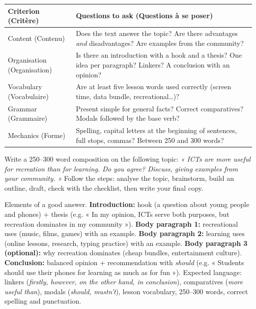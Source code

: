 \documentclass[11pt]{article}
\begin{document}
\begin{center}
\begin{tabularx}{\linewidth}{|l|X|}
\hline
\rowcolor{popgreenL} \textbf{Criterion (Critère)} & \textbf{Questions to ask (Questions à se poser)} \\
\hline
Content (Contenu) & Does the text answer the topic? Are there advantages \emph{and} disadvantages? Are examples from the community? \\
\hline
Organisation (Organisation) & Is there an introduction with a hook and a thesis? One idea per paragraph? Linkers? A conclusion with an opinion? \\
\hline
Vocabulary (Vocabulaire) & Are at least five lesson words used correctly (screen time, data bundle, recreational\ldots)? \\
\hline
Grammar (Grammaire) & Present simple for general facts? Correct comparatives? Modals followed by the base verb? \\
\hline
Mechanics (Forme) & Spelling, capital letters at the beginning of sentences, full stops, commas? Between 250 and 300 words? \\
\hline
\end{tabularx}
\end{center}

\begin{exercice}
Write a 250--300 word composition on the following topic: \emph{« ICTs are more useful for recreation than for learning. Do you agree? Discuss, giving examples from your community. »} Follow the steps: analyse the topic, brainstorm, build an outline, draft, check with the checklist, then write your final copy.
\end{exercice}

\begin{corrige}[Exercice 1]
Elements of a good answer. \textbf{Introduction:} hook (a question about young people and phones) + thesis (e.g. « In my opinion, ICTs serve both purposes, but recreation dominates in my community »). \textbf{Body paragraph 1:} recreational uses (music, films, games) with an example. \textbf{Body paragraph 2:} learning uses (online lessons, research, typing practice) with an example. \textbf{Body paragraph 3 (optional):} why recreation dominates (cheap bundles, entertainment culture). \textbf{Conclusion:} balanced opinion + recommendation with \emph{should} (e.g. « Students should use their phones for learning as much as for fun »). Expected language: linkers (\emph{firstly, however, on the other hand, in conclusion}), comparatives (\emph{more useful than}), modals (\emph{should, mustn't}), lesson vocabulary, 250--300 words, correct spelling and punctuation.
\end{corrige}
\end{document}
